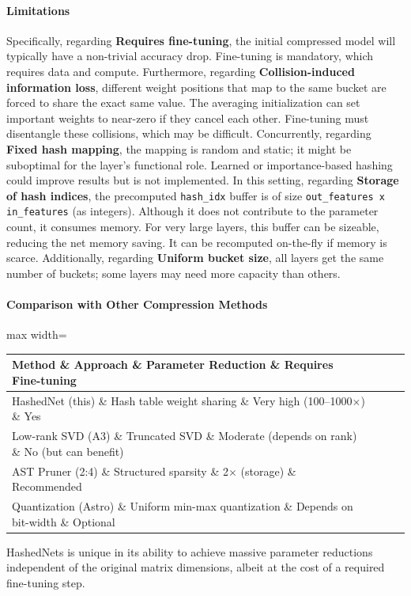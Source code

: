 \paragraph{Limitations}

Specifically, regarding \textbf{Requires fine-tuning}, the initial compressed model will typically have a non-trivial accuracy drop. Fine-tuning is mandatory, which requires data and compute. Furthermore, regarding \textbf{Collision-induced information loss}, different weight positions that map to the same bucket are forced to share the exact same value. The averaging initialization can set important weights to near-zero if they cancel each other. Fine-tuning must disentangle these collisions, which may be difficult. Concurrently, regarding \textbf{Fixed hash mapping}, the mapping is random and static; it might be suboptimal for the layer's functional role. Learned or importance-based hashing could improve results but is not implemented. In this setting, regarding \textbf{Storage of hash indices}, the precomputed \texttt{hash\_idx} buffer is of size \texttt{out\_features x in\_features} (as integers). Although it does not contribute to the parameter count, it consumes memory. For very large layers, this buffer can be sizeable, reducing the net memory saving. It can be recomputed on-the-fly if memory is scarce. Additionally, regarding \textbf{Uniform bucket size}, all layers get the same number of buckets; some layers may need more capacity than others.


\paragraph{Comparison with Other Compression Methods}

\begin{center}
\begin{adjustbox}{max width=\columnwidth}
\renewcommand{\arraystretch}{1.2}
\begin{tabular}{llll}
\toprule
Method \& Approach \& Parameter Reduction \& Requires Fine-tuning \\
\midrule
HashedNet (this) \& Hash table weight sharing \& Very high (100--1000$\times$) \& Yes \\
Low-rank SVD (A3) \& Truncated SVD \& Moderate (depends on rank) \& No (but can benefit) \\
AST Pruner (2:4) \& Structured sparsity \& 2$\times$ (storage) \& Recommended \\
Quantization (Astro) \& Uniform min-max quantization \& Depends on bit-width \& Optional \\

\bottomrule
\end{tabular}
\end{adjustbox}
\end{center}
HashedNets is unique in its ability to achieve massive parameter reductions independent of the original matrix dimensions, albeit at the cost of a required fine-tuning step.



